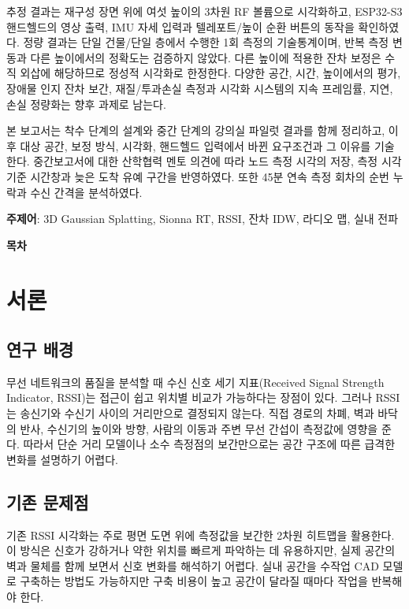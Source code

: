 \documentclass[11pt,a4paper]{article}
\makeatletter
\renewcommand{\tableofcontents}{%
  \begin{center}\bfseries\fontsize{16}{20}\selectfont 목\hspace{1.5em}차\end{center}
  \vspace{6pt}
  \begingroup\small\setlength{\parskip}{0pt}%
  \renewcommand{\numberline}[1]{\hb@xt@\@tempdima{##1.\hfil}}%
  \@starttoc{toc}\endgroup}
\makeatother
\begin{document}
추정 결과는 재구성 장면 위에 여섯 높이의 3차원 RF 볼륨으로 시각화하고, ESP32-S3 핸드헬드의 영상 출력,
IMU 자세 입력과 텔레포트/높이 순환 버튼의 동작을 확인하였다. 정량 결과는 단일 건물/단일 층에서 수행한
1회 측정의 기술통계이며, 반복 측정 변동과 다른 높이에서의 정확도는 검증하지 않았다. 다른 높이에 적용한
잔차 보정은 수직 외삽에 해당하므로 정성적 시각화로 한정한다. 다양한 공간, 시간, 높이에서의 평가, 장애물
인지 잔차 보간, 재질/투과손실 측정과 시각화 시스템의 지속 프레임률, 지연, 손실 정량화는 향후 과제로 남는다.

본 보고서는 착수 단계의 설계와 중간 단계의 강의실 파일럿 결과를 함께 정리하고, 이후 대상 공간, 보정 방식, 시각화,
핸드헬드 입력에서 바뀐 요구조건과 그 이유를 기술한다. 중간보고서에 대한 산학협력 멘토 의견에 따라 노드 측정 시각의
저장, 측정 시각 기준 시간창과 늦은 도착 유예 구간을 반영하였다. 또한 45분 연속 측정 회차의 순번 누락과 수신 간격을
분석하였다.

\vspace{10pt}
\textbf{주제어}: 3D Gaussian Splatting, Sionna RT, RSSI, 잔차 IDW, 라디오 맵, 실내 전파

\clearpage
\tableofcontents
\clearpage
{}

\section{서론}
\label{sec:1}

\subsection{연구 배경}

무선 네트워크의 품질을 분석할 때 수신 신호 세기 지표(Received Signal Strength Indicator, RSSI)는 접근이 쉽고 위치별 비교가 가능하다는 장점이
있다. 그러나 RSSI는 송신기와 수신기 사이의 거리만으로 결정되지 않는다. 직접 경로의 차폐, 벽과 바닥의 반사, 수신기의 높이와 방향, 사람의 이동과 주변 무선 간섭이 측정값에
영향을 준다. 따라서 단순 거리 모델이나 소수 측정점의 보간만으로는 공간 구조에 따른 급격한 변화를 설명하기 어렵다.

\subsection{기존 문제점}

기존 RSSI 시각화는 주로 평면 도면 위에 측정값을 보간한 2차원 히트맵을 활용한다. 이 방식은 신호가 강하거나 약한 위치를 빠르게 파악하는 데 유용하지만, 실제 공간의 벽과
물체를 함께 보면서 신호 변화를 해석하기 어렵다. 실내 공간을 수작업 CAD 모델로 구축하는 방법도 가능하지만 구축 비용이 높고 공간이 달라질 때마다 작업을 반복해야 한다.
\end{document}
